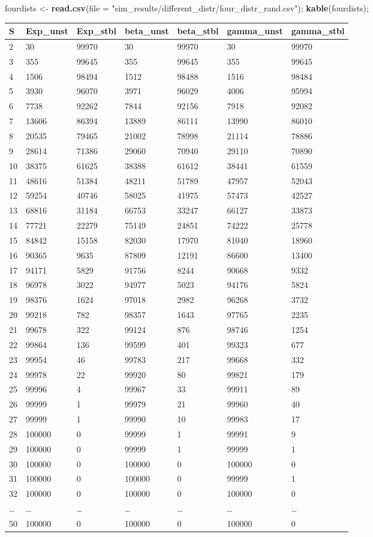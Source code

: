 \documentclass[]{article}
\newenvironment{Shaded}{\begin{snugshade}}{\end{snugshade}}
\newcommand{\KeywordTok}[1]{\textcolor[rgb]{0.13,0.29,0.53}{\textbf{{#1}}}}
\newcommand{\DataTypeTok}[1]{\textcolor[rgb]{0.13,0.29,0.53}{{#1}}}
\newcommand{\StringTok}[1]{\textcolor[rgb]{0.31,0.60,0.02}{{#1}}}
\newcommand{\NormalTok}[1]{{#1}}
\begin{document}
\begin{Shaded}
\begin{Highlighting}[]
\NormalTok{fourdists <-}\StringTok{ }\KeywordTok{read.csv}\NormalTok{(}\DataTypeTok{file =} \StringTok{"sim_results/different_distr/four_distr_rand.csv"}\NormalTok{);}
\KeywordTok{kable}\NormalTok{(fourdists);}
\end{Highlighting}
\end{Shaded}

\begin{longtable}[]{@{}lllllll@{}}
\toprule
S & Exp\_unst & Exp\_stbl & beta\_unst & beta\_stbl & gamma\_unst &
gamma\_stbl\tabularnewline
\midrule
\endhead
2 & 30 & 99970 & 30 & 99970 & 30 & 99970\tabularnewline
3 & 355 & 99645 & 355 & 99645 & 355 & 99645\tabularnewline
4 & 1506 & 98494 & 1512 & 98488 & 1516 & 98484\tabularnewline
5 & 3930 & 96070 & 3971 & 96029 & 4006 & 95994\tabularnewline
6 & 7738 & 92262 & 7844 & 92156 & 7918 & 92082\tabularnewline
7 & 13606 & 86394 & 13889 & 86111 & 13990 & 86010\tabularnewline
8 & 20535 & 79465 & 21002 & 78998 & 21114 & 78886\tabularnewline
9 & 28614 & 71386 & 29060 & 70940 & 29110 & 70890\tabularnewline
10 & 38375 & 61625 & 38388 & 61612 & 38441 & 61559\tabularnewline
11 & 48616 & 51384 & 48211 & 51789 & 47957 & 52043\tabularnewline
12 & 59254 & 40746 & 58025 & 41975 & 57473 & 42527\tabularnewline
13 & 68816 & 31184 & 66753 & 33247 & 66127 & 33873\tabularnewline
14 & 77721 & 22279 & 75149 & 24851 & 74222 & 25778\tabularnewline
15 & 84842 & 15158 & 82030 & 17970 & 81040 & 18960\tabularnewline
16 & 90365 & 9635 & 87809 & 12191 & 86600 & 13400\tabularnewline
17 & 94171 & 5829 & 91756 & 8244 & 90668 & 9332\tabularnewline
18 & 96978 & 3022 & 94977 & 5023 & 94176 & 5824\tabularnewline
19 & 98376 & 1624 & 97018 & 2982 & 96268 & 3732\tabularnewline
20 & 99218 & 782 & 98357 & 1643 & 97765 & 2235\tabularnewline
21 & 99678 & 322 & 99124 & 876 & 98746 & 1254\tabularnewline
22 & 99864 & 136 & 99599 & 401 & 99323 & 677\tabularnewline
23 & 99954 & 46 & 99783 & 217 & 99668 & 332\tabularnewline
24 & 99978 & 22 & 99920 & 80 & 99821 & 179\tabularnewline
25 & 99996 & 4 & 99967 & 33 & 99911 & 89\tabularnewline
26 & 99999 & 1 & 99979 & 21 & 99960 & 40\tabularnewline
27 & 99999 & 1 & 99990 & 10 & 99983 & 17\tabularnewline
28 & 100000 & 0 & 99999 & 1 & 99991 & 9\tabularnewline
29 & 100000 & 0 & 99999 & 1 & 99999 & 1\tabularnewline
30 & 100000 & 0 & 100000 & 0 & 100000 & 0\tabularnewline
31 & 100000 & 0 & 100000 & 0 & 99999 & 1\tabularnewline
32 & 100000 & 0 & 100000 & 0 & 100000 & 0\tabularnewline
\ldots{} & \ldots{} & \ldots{} & \ldots{} & \ldots{} & \ldots{} &
\ldots{}\tabularnewline
50 & 100000 & 0 & 100000 & 0 & 100000 & 0\tabularnewline
\bottomrule
\end{longtable}
\end{document}
